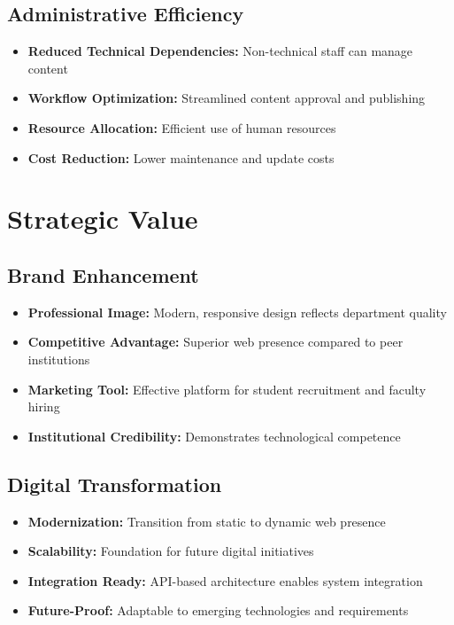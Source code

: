 \documentclass[12pt,a4paper]{report}
\begin{document}
\subsection{Administrative Efficiency}
\begin{itemize}
    \item \textbf{Reduced Technical Dependencies:} Non-technical staff can manage content
    \item \textbf{Workflow Optimization:} Streamlined content approval and publishing
    \item \textbf{Resource Allocation:} Efficient use of human resources
    \item \textbf{Cost Reduction:} Lower maintenance and update costs
\end{itemize}

\section{Strategic Value}

\subsection{Brand Enhancement}
\begin{itemize}
    \item \textbf{Professional Image:} Modern, responsive design reflects department quality
    \item \textbf{Competitive Advantage:} Superior web presence compared to peer institutions
    \item \textbf{Marketing Tool:} Effective platform for student recruitment and faculty hiring
    \item \textbf{Institutional Credibility:} Demonstrates technological competence
\end{itemize}

\subsection{Digital Transformation}
\begin{itemize}
    \item \textbf{Modernization:} Transition from static to dynamic web presence
    \item \textbf{Scalability:} Foundation for future digital initiatives
    \item \textbf{Integration Ready:} API-based architecture enables system integration
    \item \textbf{Future-Proof:} Adaptable to emerging technologies and requirements
\end{itemize}
\end{document}
